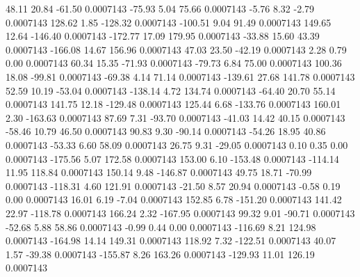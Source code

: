        48.11       20.84      -61.50     0.0007143
      -75.93        5.04       75.66     0.0007143
       -5.76        8.32       -2.79     0.0007143
      128.62        1.85     -128.32     0.0007143
     -100.51        9.04       91.49     0.0007143
      149.65       12.64     -146.40     0.0007143
     -172.77       17.09      179.95     0.0007143
      -33.88       15.60       43.39     0.0007143
     -166.08       14.67      156.96     0.0007143
       47.03       23.50      -42.19     0.0007143
        2.28        0.79        0.00     0.0007143
       60.34       15.35      -71.93     0.0007143
      -79.73        6.84       75.00     0.0007143
      100.36       18.08      -99.81     0.0007143
      -69.38        4.14       71.14     0.0007143
     -139.61       27.68      141.78     0.0007143
       52.59       10.19      -53.04     0.0007143
     -138.14        4.72      134.74     0.0007143
      -64.40       20.70       55.14     0.0007143
      141.75       12.18     -129.48     0.0007143
      125.44        6.68     -133.76     0.0007143
      160.01        2.30     -163.63     0.0007143
       87.69        7.31      -93.70     0.0007143
      -41.03       14.42       40.15     0.0007143
      -58.46       10.79       46.50     0.0007143
       90.83        9.30      -90.14     0.0007143
      -54.26       18.95       40.86     0.0007143
      -53.33        6.60       58.09     0.0007143
       26.75        9.31      -29.05     0.0007143
        0.10        0.35        0.00     0.0007143
     -175.56        5.07      172.58     0.0007143
      153.00        6.10     -153.48     0.0007143
     -114.14       11.95      118.84     0.0007143
      150.14        9.48     -146.87     0.0007143
       49.75       18.71      -70.99     0.0007143
     -118.31        4.60      121.91     0.0007143
      -21.50        8.57       20.94     0.0007143
       -0.58        0.19        0.00     0.0007143
       16.01        6.19       -7.04     0.0007143
      152.85        6.78     -151.20     0.0007143
      141.42       22.97     -118.78     0.0007143
      166.24        2.32     -167.95     0.0007143
       99.32        9.01      -90.71     0.0007143
      -52.68        5.88       58.86     0.0007143
       -0.99        0.44        0.00     0.0007143
     -116.69        8.21      124.98     0.0007143
     -164.98       14.14      149.31     0.0007143
      118.92        7.32     -122.51     0.0007143
       40.07        1.57      -39.38     0.0007143
     -155.87        8.26      163.26     0.0007143
     -129.93       11.01      126.19     0.0007143

